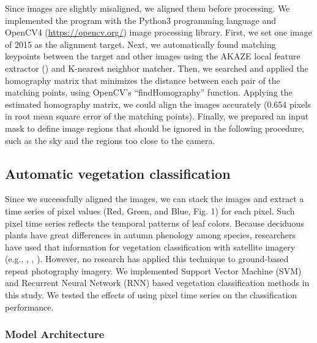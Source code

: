 \documentclass{article}
\begin{document}
Since images are slightly misaligned, we aligned them before processing. We implemented the program with the Python3 programming language and OpenCV4 (\url{https://opencv.org/}) image processing library. First, we set one image of 2015 as the alignment target. Next, we automatically found matching keypoints between the target and other images using the AKAZE local feature extractor (\cite{Alcantarilla2013AKAZE}) and K-nearest neighbor matcher. Then, we searched and applied the homography matrix that minimizes the distance between each pair of the matching points, using OpenCV's ``findHomography'' function. Applying the estimated homography matrix, we could align the images accurately (0.654 pixels in root mean square error of the matching points). Finally, we prepared an input mask to define image regions that should be ignored in the following procedure, such as the sky and the regions too close to the camera.

\hypertarget{automatic-vegetation-classification}{%
\subsection{Automatic vegetation classification}\label{automatic-vegetation-classification}}

Since we successfully aligned the images, we can stack the images and extract a time series of pixel values (Red, Green, and Blue, Fig. 1) for each pixel. Such pixel time series reflects the temporal patterns of leaf colors. Because deciduous plants have great differences in autumn phenology among species, researchers have used that information for vegetation classification with satellite imagery (e.g., \cite{Tigges2013RemSenEnv}, \cite{Son2013RemSen}, \cite{Heupel2018PFG}). However, no research has applied this technique to ground-based repeat photography imagery. We implemented Support Vector Machine (SVM) and Recurrent Neural Network (RNN) based vegetation classification methods in this study. We tested the effects of using pixel time series on the classification performance.

\hypertarget{model-architecture}{%
\subsubsection{Model Architecture}\label{model-architecture}}
\end{document}

